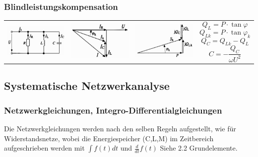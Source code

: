 \subsubsection{Blindleistungskompensation}
\begin{tabular}{p{4cm}p{4cm}p{4cm}p{6cm}}
\begin{minipage}{4cm}
    	\includegraphics[width=3.5cm]{./images/Parallelkompensation.png}
    	\end{minipage}
	& \begin{minipage}{4cm}
    	\includegraphics[width=3.5cm]{./images/Blindstromkompensation.png}
    	\end{minipage}
	& \begin{minipage}{4cm}
    	\includegraphics[width=3.5cm]{./images/Blindleistungskompensation.png}
    	\end{minipage} 
	& \begin{minipage}{6cm} 
		$$Q_{L} = P \cdot \tan{\varphi}$$     
		$$Q_{Lk} = P \cdot \tan{\varphi_k}$$
		$$Q_C = Q_{Lk} - Q_L$$
		$$C = -\frac{Q_C}{\omega U^2}$$
		\end{minipage}
\end{tabular}

\subsection{Systematische Netzwerkanalyse}

\subsubsection{Netzwerkgleichungen, Integro-Differentialgleichungen}
Die Netzwerkgleichungen werden nach den selben Regeln aufgestellt, wie für Widerstandsnetze, wobei die Energiespeicher (C,L,M) im Zeitbereich aufgeschrieben werden mit $\int f(t) dt$ und $\frac{d}{dt} f(t)$ Siehe 2.2 Grundelemente.	\\ 

